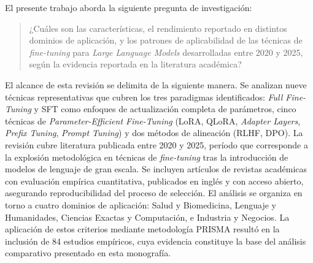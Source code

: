 El presente trabajo aborda la siguiente pregunta de investigación:
\begin{quote}
¿Cuáles son las características, el rendimiento reportado en distintos dominios de aplicación, y los patrones de aplicabilidad de las técnicas de \textit{fine-tuning} para \textit{Large Language Models} desarrolladas entre 2020 y 2025, según la evidencia reportada en la literatura académica?
\end{quote}

El alcance de esta revisión se delimita de la siguiente manera. Se analizan nueve técnicas representativas que cubren los tres paradigmas identificados: \textit{Full Fine-Tuning} y SFT como enfoques de actualización completa de parámetros, cinco técnicas de \textit{Parameter-Efficient Fine-Tuning} (LoRA, QLoRA, \textit{Adapter Layers}, \textit{Prefix Tuning}, \textit{Prompt Tuning}) y dos métodos de alineación (RLHF, DPO). La revisión cubre literatura publicada entre 2020 y 2025, período que corresponde a la explosión metodológica en técnicas de \textit{fine-tuning} tras la introducción de modelos de lenguaje de gran escala. Se incluyen artículos de revistas académicas con evaluación empírica cuantitativa, publicados en inglés y con acceso abierto, asegurando reproducibilidad del proceso de selección. El análisis se organiza en torno a cuatro dominios de aplicación: Salud y Biomedicina, Lenguaje y Humanidades, Ciencias Exactas y Computación, e Industria y Negocios. La aplicación de estos criterios mediante metodología PRISMA resultó en la inclusión de 84 estudios empíricos, cuya evidencia constituye la base del análisis comparativo presentado en esta monografía.